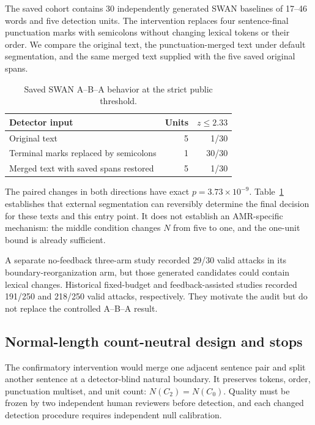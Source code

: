 \documentclass[10pt]{article}
\begin{document}
The saved cohort contains 30 independently generated SWAN baselines of
17--46 words and five detection units. The intervention replaces four
sentence-final punctuation marks with semicolons without changing lexical
tokens or their order. We compare the original text, the punctuation-merged
text under default segmentation, and the same merged text supplied with the
five saved original spans.

\begin{table}[t]
\caption{Saved SWAN A--B--A behavior at the strict public threshold.}
\label{tab:swan-aba}
\centering
\begin{tabular}{lrr}
\toprule
Detector input & Units & $z\leq2.33$ \\
\midrule
Original text & 5 & 1/30 \\
Terminal marks replaced by semicolons & 1 & 30/30 \\
Merged text with saved spans restored & 5 & 1/30 \\
\bottomrule
\end{tabular}
\end{table}

The paired changes in both directions have exact $p=3.73\times10^{-9}$.
Table~\ref{tab:swan-aba} establishes that external segmentation can
reversibly determine the final decision for these texts and this entry point.
It does not establish an AMR-specific mechanism: the middle condition changes
$N$ from five to one, and the one-unit bound is already sufficient.

A separate no-feedback three-arm study recorded 29/30 valid attacks in its
boundary-reorganization arm, but those generated candidates could contain
lexical changes. Historical fixed-budget and feedback-assisted studies
recorded 191/250 and 218/250 valid attacks, respectively. They motivate the
audit but do not replace the controlled A--B--A result.

\subsection{Normal-length count-neutral design and stops}

The confirmatory intervention would merge one adjacent sentence pair and
split another sentence at a detector-blind natural boundary. It preserves
tokens, order, punctuation multiset, and unit count:
$N(C_2)=N(C_0)$. Quality must be frozen by two independent human reviewers
before detection, and each changed detection procedure requires independent
null calibration.
\end{document}
